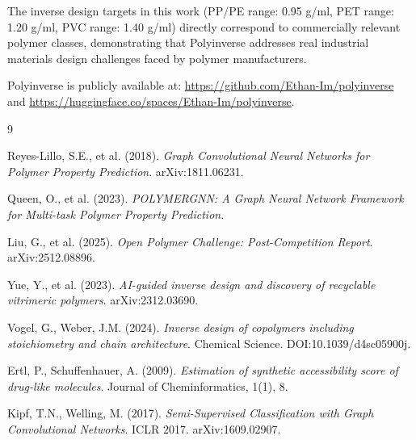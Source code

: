 \documentclass{article}
\begin{document}
The inverse design targets in this work (PP/PE range: 0.95 g/ml, 
PET range: 1.20 g/ml, PVC range: 1.40 g/ml) directly correspond to 
commercially relevant polymer classes, demonstrating that Polyinverse 
addresses real industrial materials design challenges faced by polymer 
manufacturers.

Polyinverse is publicly available at:
\url{https://github.com/Ethan-Im/polyinverse} and
\url{https://huggingface.co/spaces/Ethan-Im/polyinverse}.


\begin{thebibliography}{9}

Reyes-Lillo, S.E., et al. (2018).
\textit{Graph Convolutional Neural Networks for Polymer Property Prediction}.
arXiv:1811.06231.

Queen, O., et al. (2023).
\textit{POLYMERGNN: A Graph Neural Network Framework for Multi-task Polymer Property Prediction}.

Liu, G., et al. (2025).
\textit{Open Polymer Challenge: Post-Competition Report}.
arXiv:2512.08896.

Yue, Y., et al. (2023).
\textit{AI-guided inverse design and discovery of recyclable vitrimeric polymers}.
arXiv:2312.03690.

Vogel, G., Weber, J.M. (2024).
\textit{Inverse design of copolymers including stoichiometry and chain architecture}.
Chemical Science. DOI:10.1039/d4sc05900j.

Ertl, P., Schuffenhauer, A. (2009).
\textit{Estimation of synthetic accessibility score of drug-like molecules}.
Journal of Cheminformatics, 1(1), 8.

Kipf, T.N., Welling, M. (2017).
\textit{Semi-Supervised Classification with Graph Convolutional Networks}.
ICLR 2017. arXiv:1609.02907.

\end{thebibliography}
\end{document}
